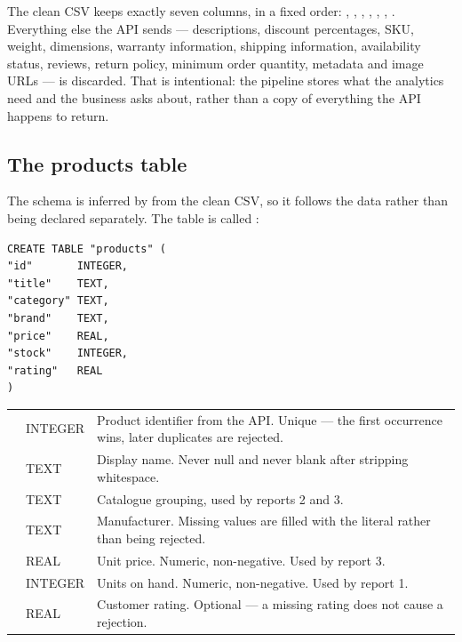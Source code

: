 The clean CSV keeps exactly seven columns, in a fixed order:
, , , , ,
, . Everything else the API sends ---
descriptions, discount percentages, SKU, weight, dimensions, warranty
information, shipping information, availability status, reviews, return
policy, minimum order quantity, metadata and image URLs --- is discarded.
That is intentional: the pipeline stores what the analytics need and the
business asks about, rather than a copy of everything the API happens to
return.

\subsection{The products table}

The schema is inferred by  from the clean CSV, so it follows
the data rather than being declared separately. The table is called
:

\begin{codebox}
\noindent
\begin{lstlisting}[style=txt]
CREATE TABLE "products" (
"id"       INTEGER,
"title"    TEXT,
"category" TEXT,
"brand"    TEXT,
"price"    REAL,
"stock"    INTEGER,
"rating"   REAL
)
\end{lstlisting}
\end{codebox}

\noindent
\begin{tabularx}{\textwidth}{@{}L{2.4cm}L{2.0cm}Y@{}}
 &  &  \\
\midrule
{} & INTEGER & Product identifier from the API. Unique --- the first occurrence wins, later duplicates are rejected. \\
 & TEXT & Display name. Never null and never blank after stripping whitespace. \\
 & TEXT & Catalogue grouping, used by reports 2 and 3. \\
 & TEXT & Manufacturer. Missing values are filled with the literal  rather than being rejected. \\
 & REAL & Unit price. Numeric, non-negative. Used by report 3. \\
 & INTEGER & Units on hand. Numeric, non-negative. Used by report 1. \\
 & REAL & Customer rating. Optional --- a missing rating does not cause a rejection. \\
\end{tabularx}

